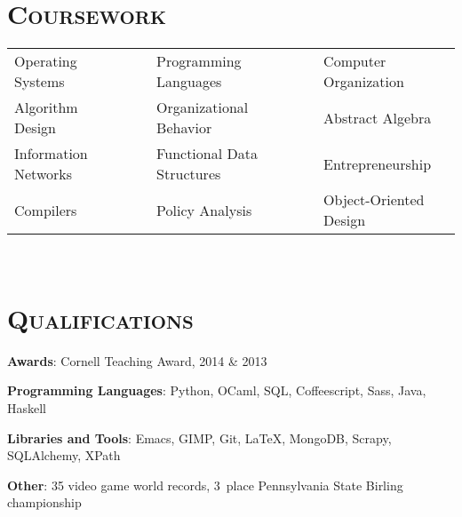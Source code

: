 \begin{resume}
\vfill

\renewcommand*\arraystretch{1.2}
\section{\textsc{Coursework}}
\begin{tabular}{lllll}
 Operating Systems      & \ \ & Programming Languages           & \ \ & Computer Organization \\
 Algorithm Design      & \ \ & Organizational Behavior       & \ \ & Abstract Algebra    \\
 Information Networks     & \ \ & Functional Data Structures       & \ \ &  Entrepreneurship       \\
 Compilers      & \ \ &  Policy Analysis   & \ \ & Object-Oriented Design   \\
\end{tabular}\\



\vfill

\section{\textsc{Qualifications}}

\textbf{Awards}: Cornell Teaching Award, 2014 \& 2013

\textbf{Programming Languages}: Python, OCaml, SQL, Coffeescript, Sass, Java, Haskell

\textbf{Libraries and Tools}: Emacs, GIMP, Git, \LaTeX, MongoDB, Scrapy, SQLAlchemy, XPath

\textbf{Other}: 35 video game world records, 3\third \ place Pennsylvania State Birling championship

\vfill{}

\end{resume}

